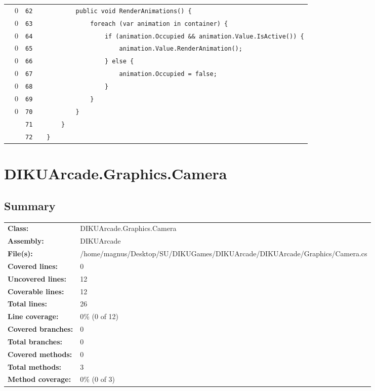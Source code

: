 \documentclass[a4paper,landscape,10pt]{article}
\begin{document}
\begin{longtable}[l]{lrrll}
\cellcolor{red} & 0 & \verb~62~ & & \verb~        public void RenderAnimations() {~\\
\cellcolor{red} & 0 & \verb~63~ & & \verb~            foreach (var animation in container) {~\\
\cellcolor{red} & 0 & \verb~64~ & & \verb~                if (animation.Occupied && animation.Value.IsActive()) {~\\
\cellcolor{red} & 0 & \verb~65~ & & \verb~                    animation.Value.RenderAnimation();~\\
\cellcolor{red} & 0 & \verb~66~ & & \verb~                } else {~\\
\cellcolor{red} & 0 & \verb~67~ & & \verb~                    animation.Occupied = false;~\\
\cellcolor{red} & 0 & \verb~68~ & & \verb~                }~\\
\cellcolor{red} & 0 & \verb~69~ & & \verb~            }~\\
\cellcolor{red} & 0 & \verb~70~ & & \verb~        }~\\
\cellcolor{gray} &  & \verb~71~ & & \verb~    }~\\
\cellcolor{gray} &  & \verb~72~ & & \verb~}~\\
\end{longtable}
\newpage
\section{DIKUArcade.Graphics.Camera}
\subsection{Summary}
\begin{longtable}[l]{ll}
\textbf{Class:} & DIKUArcade.Graphics.Camera\\
\textbf{Assembly:} & DIKUArcade\\
\textbf{File(s):} & \begin{minipage}[t]{12cm}{/home/magnus/Desktop/SU/DIKUGames/DIKUArcade/DIKUArcade/Graphics/Camera.cs}\end{minipage} \\
\textbf{Covered lines:} & 0\\
\textbf{Uncovered lines:} & 12\\
\textbf{Coverable lines:} & 12\\
\textbf{Total lines:} & 26\\
\textbf{Line coverage:} & 0\% (0 of 12)\\
\textbf{Covered branches:} & 0\\
\textbf{Total branches:} & 0\\
\textbf{Covered methods:} & 0\\
\textbf{Total methods:} & 3\\
\textbf{Method coverage:} & 0\% (0 of 3)\\
\end{longtable}
\end{document}
